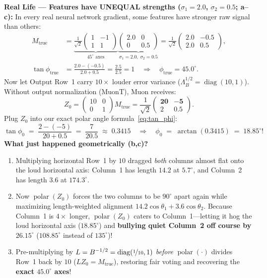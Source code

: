 \documentclass[11pt]{article}
\newcommand{\diag}{\operatorname{diag}}
\newcommand{\polar}{\operatorname{polar}}
\newcommand{\mname}[1]{#1}
\begin{document}
\begin{toybox}
\smallskip
\textbf{Real Life --- Features have UNEQUAL strengths ($\sigma_1 = 2.0$, $\sigma_2 = 0.5$; a--c):}
In every real neural network gradient, some features have stronger raw signal than others:
\begin{align*}
  M_{\mathrm{true}}
  &= \underbrace{\frac{1}{\sqrt{2}}\begin{pmatrix} 1 & -1 \\ 1 & 1 \end{pmatrix}}_{45^\circ\text{ axes}}
     \underbrace{\begin{pmatrix} 2.0 & 0 \\ 0 & 0.5 \end{pmatrix}}_{\sigma_1=2.0,\;\sigma_2=0.5}
   = \frac{1}{\sqrt{2}}\begin{pmatrix} 2.0 & -0.5 \\ 2.0 & 0.5 \end{pmatrix}, \\
  \tan\phi_{\mathrm{true}} &= \frac{2.0 - (-0.5)}{2.0 + 0.5} = \frac{2.5}{2.5} = 1 \quad\Longrightarrow\quad \phi_{\mathrm{true}} = \mathbf{45.0^\circ}.
\end{align*}
Now let Output Row~1 carry $10\times$ louder error variance ($\Lambda_B^{1/2} = \diag(10, 1)$). Without output normalization (\mname{MuonT}), \mname{Muon} receives:
\[
  Z_0
  = \begin{pmatrix} 10 & 0 \\ 0 & 1 \end{pmatrix} M_{\mathrm{true}}
  = \frac{1}{\sqrt{2}}\begin{pmatrix} \mathbf{20} & \mathbf{-5} \\ 2 & 0.5 \end{pmatrix}.
\]
Plug $Z_0$ into our exact polar angle formula~\eqref{eq:tan_phi}:
\[
  \tan\phi_0 \;=\; \frac{2 - (-5)}{20 + 0.5} \;=\; \frac{7}{20.5} \;\approx\; 0.3415
  \quad\Longrightarrow\quad
  \phi_0 \;=\; \arctan(0.3415) \;=\; \mathbf{18.85^\circ}!
\]
\textbf{What just happened geometrically (b,c)?}
\begin{enumerate}[leftmargin=1.5em, itemsep=1.5pt, topsep=2pt]
  \item Multiplying horizontal Row~1 by $10$ dragged \emph{both} columns almost flat onto the loud horizontal axis: Column~1 has length $\mathbf{14.2}$ at $5.7^\circ$, and Column~2 has length $\mathbf{3.6}$ at $174.3^\circ$.
  \item Now $\polar(Z_0)$ forces the two columns to be $90^\circ$ apart again while maximizing length-weighted alignment $14.2\cos\theta_1 + 3.6\cos\theta_2$. Because Column~1 is $4\times$ longer, $\polar(Z_0)$ caters to Column~1---letting it hog the loud horizontal axis ($18.85^\circ$) and \textbf{bullying quiet Column~2 off course by $26.15^\circ$} ($108.85^\circ$ instead of $135^\circ$)!
  \item Pre-multiplying by $L = B^{-1/2} = \diag(\nicefrac{1}{10}, 1)$ \emph{before} $\polar(\cdot)$ divides Row~1 back by $10$ ($L Z_0 = M_{\mathrm{true}}$), restoring fair voting and recovering the \textbf{exact $45.0^\circ$ axes}!
\end{enumerate}
\end{toybox}
\end{document}
